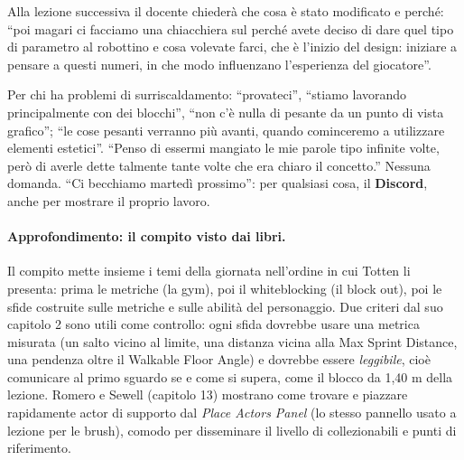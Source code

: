 Alla lezione successiva il docente chiederà che cosa è stato modificato e perché: ``poi
magari ci facciamo una chiacchiera sul perché avete deciso di dare quel tipo di parametro
al robottino e cosa volevate farci, che è l'inizio del design: iniziare a pensare a questi
numeri, in che modo influenzano l'esperienza del giocatore''.

Per chi ha problemi di surriscaldamento: ``provateci'', ``stiamo lavorando principalmente con
dei blocchi'', ``non c'è nulla di pesante da un punto di vista grafico''; ``le cose pesanti
verranno più avanti, quando cominceremo a utilizzare elementi estetici''. ``Penso di essermi
mangiato le mie parole tipo infinite volte, però di averle dette talmente tante volte che
era chiaro il concetto.'' Nessuna domanda. ``Ci becchiamo martedì prossimo'': per qualsiasi
cosa, il \textbf{Discord}, anche per mostrare il proprio lavoro.

\paragraph{Approfondimento: il compito visto dai libri.} Il compito mette insieme i temi
della giornata nell'ordine in cui Totten li presenta: prima le metriche (la gym), poi il
whiteblocking (il block out), poi le sfide costruite sulle metriche e sulle abilità del
personaggio. Due criteri dal suo capitolo 2 sono utili come controllo: ogni sfida dovrebbe
usare una metrica misurata (un salto vicino al limite, una distanza vicina alla Max Sprint
Distance, una pendenza oltre il Walkable Floor Angle) e dovrebbe essere \emph{leggibile},
cioè comunicare al primo sguardo se e come si supera, come il blocco da 1,40 m della
lezione. Romero e Sewell (capitolo 13) mostrano come trovare e piazzare rapidamente
actor di supporto dal \emph{Place Actors Panel} (lo stesso pannello usato a lezione per le
brush), comodo per disseminare il livello di collezionabili e punti di riferimento.

